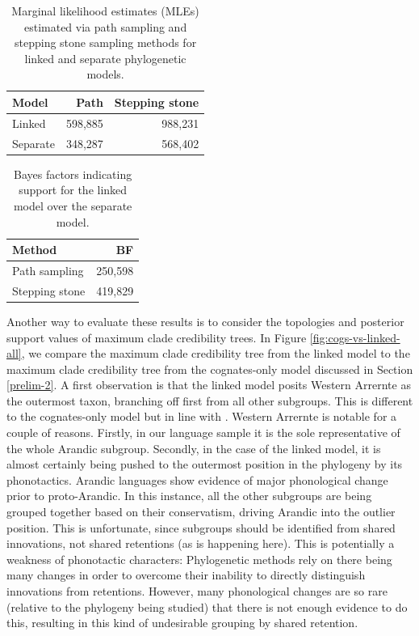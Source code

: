 \documentclass[]{article}
\begin{document}
\begin{table}

\caption{\label{tab:linked-vs-separate-mles}Marginal likelihood estimates (MLEs) estimated via path sampling and stepping stone sampling methods for linked and separate phylogenetic models.}
\centering
\begin{tabular}[t]{lrr}
\toprule
Model & Path & Stepping stone\\
\midrule
Linked & 598,885 & 988,231\\
Separate & 348,287 & 568,402\\
\bottomrule
\end{tabular}
\end{table}

\begin{table}

\caption{\label{tab:linked-vs-separate-bfs}Bayes factors indicating support for the linked model over the separate model.}
\centering
\begin{tabular}[t]{lr}
\toprule
Method & BF\\
\midrule
Path sampling & 250,598\\
Stepping stone & 419,829\\
\bottomrule
\end{tabular}
\end{table}

Another way to evaluate these results is to consider the topologies and posterior support values of maximum clade credibility trees. In Figure \ref{fig:cogs-vs-linked-all}, we compare the maximum clade credibility tree from the linked model to the maximum clade credibility tree from the cognates-only model discussed in Section \ref{prelim-2}. A first observation is that the linked model posits Western Arrernte as the outermost taxon, branching off first from all other subgroups. This is different to the cognates-only model but in line with \textcite{bouckaert_origin_2018}. Western Arrernte is notable for a couple of reasons. Firstly, in our language sample it is the sole representative of the whole Arandic subgroup. Secondly, in the case of the linked model, it is almost certainly being pushed to the outermost position in the phylogeny by its phonotactics. Arandic languages show evidence of major phonological change prior to proto-Arandic. In this instance, all the other subgroups are being grouped together based on their conservatism, driving Arandic into the outlier position. This is unfortunate, since subgroups should be identified from shared innovations, not shared retentions (as is happening here). This is potentially a weakness of phonotactic characters: Phylogenetic methods rely on there being many changes in order to overcome their inability to directly distinguish innovations from retentions. However, many phonological changes are so rare (relative to the phylogeny being studied) that there is not enough evidence to do this, resulting in this kind of undesirable grouping by shared retention.
\end{document}
